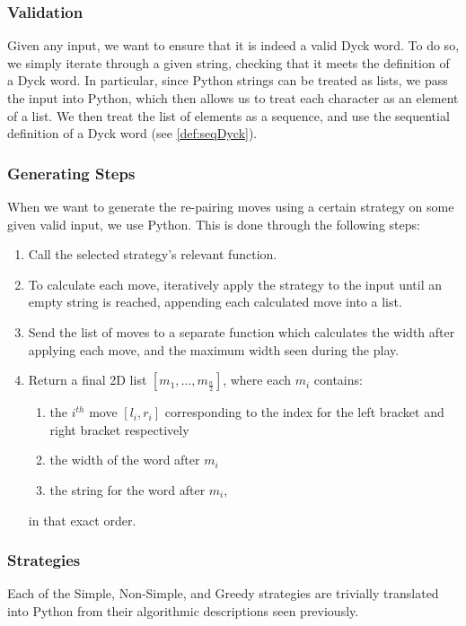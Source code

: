 \subsubsection{Validation}
Given any input, we want to ensure that it is indeed a valid Dyck word. To do so, we simply iterate through a given string, checking that it meets the definition of a Dyck word. In particular, since Python strings can be treated as lists, we pass the input into Python, which then allows us to treat each character as an element of a list. We then treat the list of elements as a sequence, and use the sequential definition of a Dyck word (see \autoref{def:seqDyck}). 

\subsubsection{Generating Steps}
When we want to generate the re-pairing moves using a certain strategy on some given valid input, we use Python. This is done through the following steps:
\begin{enumerate}
    \item Call the selected strategy's relevant function.
    \item To calculate each move, iteratively apply the strategy to the input until an empty string is reached, appending each calculated move into a list.
    \item Send the list of moves to a separate function which calculates the width after applying each move, and the maximum width seen during the play.
    \item Return a final 2D list $[m_{1}, \dots, m_{\frac{n}{2}}]$, where each $m_{i}$ contains: 
    \begin{enumerate}
        \item the $i^{th}$ move $[l_{i}, r_{i}]$ corresponding to the index for the left bracket and right bracket respectively
        \item the width of the word after $m_{i}$
        \item the string for the word after $m_{i}$,
    \end{enumerate}
    in that exact order.
\end{enumerate}

\subsubsection{Strategies}
Each of the Simple, Non-Simple, and Greedy strategies are trivially translated into Python from their algorithmic descriptions seen previously.

